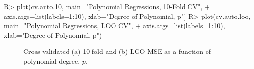 \documentclass[
]{jss}
\begin{document}
\begin{CodeChunk}
\begin{CodeInput}
R> plot(cv.auto.10, main="Polynomial Regressions, 10-Fold CV",
+      axis.args=list(labels=1:10), xlab="Degree of Polynomial, p")
R> plot(cv.auto.loo, main="Polynomial Regressions, LOO CV",
+      axis.args=list(labels=1:10), xlab="Degree of Polynomial, p")
\end{CodeInput}
\begin{figure}

{\centering {}

}

\caption[Cross-validated (a) 10-fold and (b) LOO MSE as a function of polynomial degree, $p$]{Cross-validated (a) 10-fold and (b) LOO MSE as a function of polynomial degree, $p$.}\label{fig:polynomial-regression-CV-graph-2}
\end{figure}
\end{CodeChunk}
\end{document}
